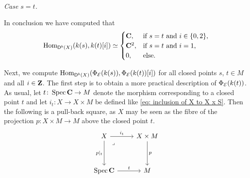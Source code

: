     \vspace{0.3cm}
    \noindent
    \textsl{Case $s = t$.}


    

    In conclusion we have computed that
    \begin{equation}
            \operatorname{Hom}_{\mathsf{D}^b(X)}(k(s), k(t)[i]) \simeq \begin{cases}
                \mathbf C, &\text{if $s = t$ and $i \in \{0, 2\}$,} \\
                \mathbf C^2, &\text{if $s = t$ and $i = 1$,} \\
                0, &\text{else.}
            \end{cases}
    \end{equation}
    
    Next, we compute $\operatorname{Hom}_{\mathsf{D}^b(X)}(\Phi_{\mathcal E}(k(s)), \Phi_{\mathcal E}(k(t))[i])$ for all closed points $s$, $t \in M$ and all $i \in \mathbf Z$. The first step is to obtain a more practical description of $\Phi_{\mathcal E}(k(t))$. As usual, let $t \colon \operatorname{Spec}\mathbf C \to M$ denote the morphism corresponding to a closed point $t$ and let $i_t \colon X \to X \times M$ be defined like \eqref{eq: inclusion of X to X x S}. Then the following is a pull-back square, as $X$ may be seen as the fibre of the projection $p \colon X \times M \to M$ above the closed point $t$.
    \[\begin{tikzcd}[column sep = small, row sep = 1.8em]
        X && X \times M \\
        \\
        \spec{\C} && M
        \arrow["{i_t}", from=1-1, to=1-3]
        \arrow["{p|_t}"', from=1-1, to=3-1]
        \arrow["\lrcorner"{anchor=center, pos=0.125}, draw=none, from=1-1, to=3-3]
        \arrow["{p}", from=1-3, to=3-3]
        \arrow["{t}", from=3-1, to=3-3]
    \end{tikzcd}\]



